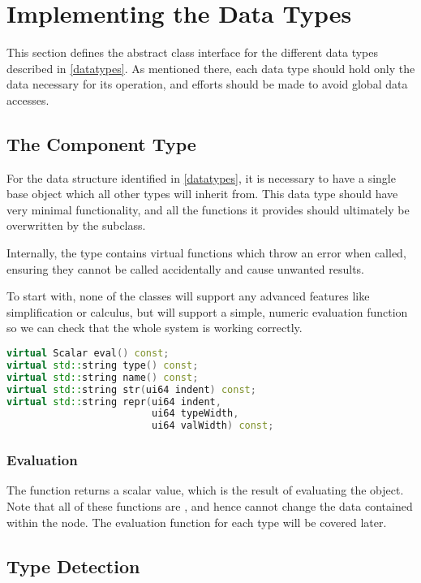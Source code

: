 \documentclass[12pt]{article}
\begin{document}
\pagebreak

\section{Implementing the Data Types}

This section defines the abstract class interface for the different data types described in \ref{datatypes}. As mentioned there, each data type should hold only the data necessary for its operation, and efforts should be made to avoid global data accesses.

\subsection{The Component Type}

For the data structure identified in \ref{datatypes}, it is necessary to have a single base object which all other types will inherit from. This data type should have very minimal functionality, and all the functions it provides should ultimately be overwritten by the subclass.

Internally, the  type contains virtual functions which throw an error when called, ensuring they cannot be called accidentally and cause unwanted results.

To start with, none of the classes will support any advanced features like simplification or calculus, but will support a simple, numeric evaluation function so we can check that the whole system is working correctly.

\begin{lstlisting}[language=C++]
virtual Scalar eval() const;
virtual std::string type() const;
virtual std::string name() const;
virtual std::string str(ui64 indent) const;
virtual std::string repr(ui64 indent,
                         ui64 typeWidth,
                         ui64 valWidth) const;
\end{lstlisting}

\subsubsection{Evaluation}

The  function returns a scalar value, which is the result of evaluating the object. Note that all of these functions are , and hence cannot change the data contained within the node. The evaluation function for each type will be covered later.

\subsection{Type Detection}
\end{document}
